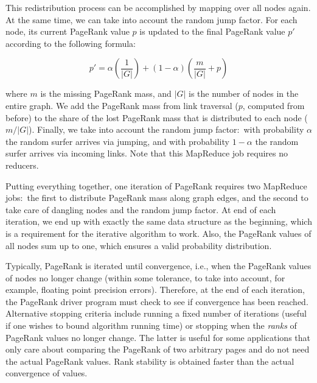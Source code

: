 This redistribution process can be accomplished by mapping over all
nodes again.  At the same time, we can take into account the random
jump factor.  For each node, its current PageRank value $p$ is updated
to the final PageRank value $p'$ according to the following formula:

\begin{equation}
p' = \alpha \left( \frac{1}{|G|} \right) + \left( 1-\alpha \right) \left( \frac{m}{|G|} + p \right)
\end{equation}

\noindent where $m$ is the missing PageRank mass, and $|G|$ is the
number of nodes in the entire graph.  We add the PageRank mass from
link traversal ($p$, computed from before) to the share of the lost
PageRank mass that is distributed to each node ($m/|G|$).  Finally, we
take into account the random jump factor:\ with probability $\alpha$
the random surfer arrives via jumping, and with probability $1-\alpha$
the random surfer arrives via incoming links.  Note that this
MapReduce job requires no reducers.

Putting everything together, one iteration of PageRank requires two
MapReduce jobs:\ the first to distribute PageRank mass along graph
edges, and the second to take care of dangling nodes and the random
jump factor.  At end of each iteration, we end up with
exactly the same data structure as the beginning, which is a
requirement for the iterative algorithm to work.  Also, the PageRank
values of all nodes sum up to one, which ensures a valid probability
distribution.

Typically, PageRank is iterated until convergence, i.e., when the
PageRank values of nodes no longer change (within some tolerance, to
take into account, for example, floating point precision errors).
Therefore, at the end of each iteration, the PageRank driver program
must check to see if convergence has been reached.  Alternative
stopping criteria include running a fixed number of iterations (useful
if one wishes to bound algorithm running time) or stopping when the
\emph{ranks} of PageRank values no longer change.  The latter is useful
for some applications that only care about comparing the PageRank of
two arbitrary pages and do not need the actual PageRank values.  Rank
stability is obtained faster than the actual convergence of values.

